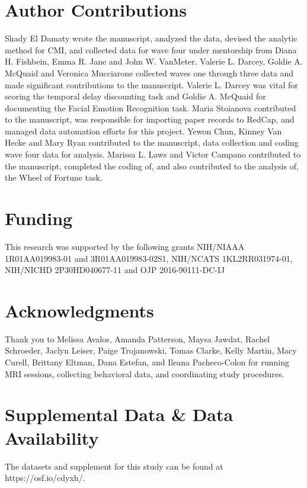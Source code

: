 \documentclass[utf8]{stylesheet}
\begin{document}
\section*{Author Contributions}
Shady El Damaty wrote the manuscript, analyzed the data, devised the analytic method for CMI, and collected data for wave four under mentorship from Diana H. Fishbein, Emma R. Jane and John W. VanMeter. Valerie L. Darcey, Goldie A. McQuaid and Veronica Mucciarone collected waves one through three data and made significant contributions to the manuscript. Valerie L. Darcey was vital for scoring the temporal delay discounting task and Goldie A. McQuaid for documenting the Facial Emotion Recognition task. Maria Stoianova contributed to the manuscript, was responsible for importing paper records to RedCap, and managed data automation efforts for this project. Yewon Chun, Kinney Van Hecke and Mary Ryan contributed to the manuscript, data collection and coding wave four data for analysis. Marissa L. Laws and Victor Campano contributed to the manuscript, completed the coding of, and also contributed to the analysis of, the Wheel of Fortune task.

\section*{Funding}
This research was supported by the following grants NIH/NIAAA 1R01AA019983-01 and 3R01AA019983-02S1, NIH/NCATS 1KL2RR031974-01, 
NIH/NICHD 2P30HD040677-11 and OJP 2016-90111-DC-IJ


\section*{Acknowledgments}
Thank you to Melissa Avalos, Amanda Patterson, Maysa Jawdat, Rachel Schroeder, Jaclyn Leiser, Paige Trojanowski, Tomas Clarke, Kelly Martin, Macy Curell, Brittany Eltman, Dana Estefan, and Ileana Pacheco-Colon for running MRI sessions, collecting behavioral data, and coordinating study procedures. 

\section*{Supplemental Data \& Data Availability}
The datasets and supplement for this study can be found at https://osf.io/cdyxh/.
\newpage
\end{document}
